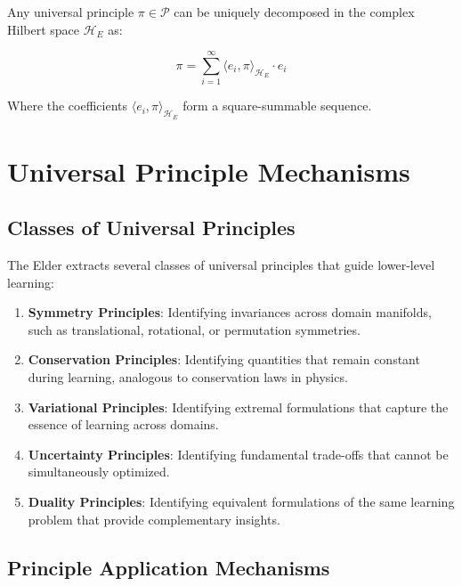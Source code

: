 \begin{theorem}
Any universal principle $\pi \in \mathcal{P}$ can be uniquely decomposed in the complex Hilbert space $\mathcal{H}_E$ as:

\begin{equation}
\pi = \sum_{i=1}^{\infty} \langle e_i, \pi \rangle_{\mathcal{H}_E} \cdot e_i
\end{equation}

Where the coefficients $\langle e_i, \pi \rangle_{\mathcal{H}_E}$ form a square-summable sequence.
\end{theorem}

\section{Universal Principle Mechanisms}

\subsection{Classes of Universal Principles}

The Elder extracts several classes of universal principles that guide lower-level learning:

\begin{enumerate}
\item \textbf{Symmetry Principles}: Identifying invariances across domain manifolds, such as translational, rotational, or permutation symmetries.

\item \textbf{Conservation Principles}: Identifying quantities that remain constant during learning, analogous to conservation laws in physics.

\item \textbf{Variational Principles}: Identifying extremal formulations that capture the essence of learning across domains.

\item \textbf{Uncertainty Principles}: Identifying fundamental trade-offs that cannot be simultaneously optimized.

\item \textbf{Duality Principles}: Identifying equivalent formulations of the same learning problem that provide complementary insights.
\end{enumerate}

\subsection{Principle Application Mechanisms}


